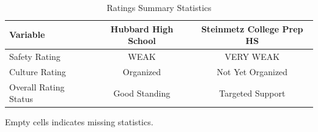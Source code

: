 \begin{table}[H]
\renewcommand{\arraystretch}{1.5}
\caption*{
{\large Ratings Summary Statistics}
} 

\fontsize{10pt}{11pt}\selectfont

\begin{tabular*}{\linewidth}{@{\extracolsep{\fill}}lcc}
\toprule
Variable & Hubbard High School & Steinmetz College Prep HS \\ 
\midrule\addlinespace[2.5pt]
Safety Rating & WEAK & VERY WEAK \\
Culture Rating & Organized & Not Yet Organized \\
Overall Rating Status & Good Standing & Targeted Support \\
\bottomrule
\end{tabular*}
\begin{minipage}{\linewidth}
Empty cells indicates missing statistics.\\
\end{minipage}
\end{table}
